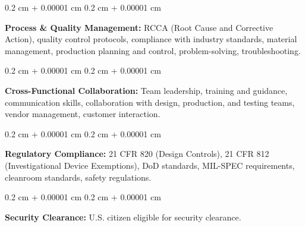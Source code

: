 \documentclass[10pt, letterpaper]{article}
\newenvironment{onecolentry}{
    \begin{adjustwidth}{
        0.2 cm + 0.00001 cm
    }{
        0.2 cm + 0.00001 cm
    }
}{
    \end{adjustwidth}
} %
\begin{document}
        \vspace{0.2 cm}

        \begin{onecolentry}
            \textbf{Process \& Quality Management:} RCCA (Root Cause and Corrective Action), quality control protocols, compliance with industry standards, material management, production planning and control, problem-solving, troubleshooting.
        \end{onecolentry}

        \vspace{0.2 cm}

        \begin{onecolentry}
            \textbf{Cross-Functional Collaboration:} Team leadership, training and guidance, communication skills, collaboration with design, production, and testing teams, vendor management, customer interaction.
        \end{onecolentry}

        \vspace{0.2 cm}

        \begin{onecolentry}
            \textbf{Regulatory Compliance:} 21 CFR 820 (Design Controls), 21 CFR 812 (Investigational Device Exemptions), DoD standards, MIL-SPEC requirements, cleanroom standards, safety regulations.
        \end{onecolentry}

        \vspace{0.2 cm}

        \begin{onecolentry}
            \textbf{Security Clearance:} U.S. citizen eligible for security clearance.
        \end{onecolentry}


    
\end{document}
